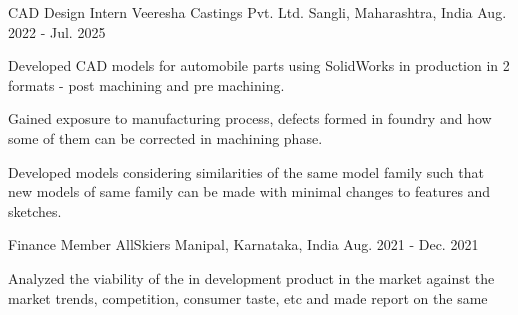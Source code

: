 
\begin{cventries}
	\cventry
	{CAD Design Intern} %
	{Veeresha Castings Pvt. Ltd.} %
	{Sangli, Maharashtra, India} %
	{Aug. 2022 - Jul. 2025} %
	{
		\begin{cvitems}
			\item {
			            Developed CAD models for automobile parts using SolidWorks in
			            production in 2 formats - post machining and pre machining.
			      }
			\item {
			            Gained exposure to manufacturing process, defects formed in foundry
			            and how some of them can be corrected in machining phase.
			      }
			\item {
			            Developed models considering similarities of the same model family
			            such that new models of same family can be made with minimal changes
			            to features and sketches.
			      }
		\end{cvitems}
	}

	\cventry
	{Finance Member} %
	{AllSkiers } %
	{Manipal, Karnataka, India} %
	{Aug. 2021 - Dec. 2021} %
	{
		\begin{cvitems} %
			\item {
			            Analyzed the viability of the in development product in the market
			            against the market trends, competition, consumer taste, etc and
			            made report on the same
			      }
		\end{cvitems}
	}

\end{cventries}
